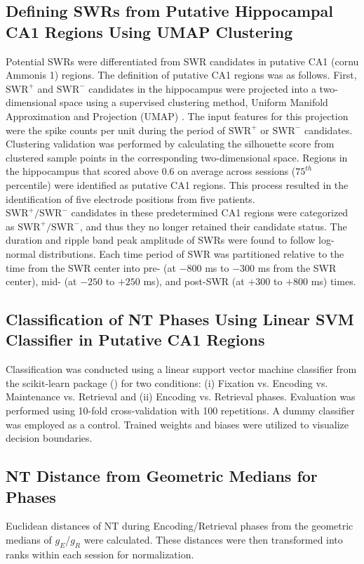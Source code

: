 \subsection{Defining SWRs from Putative Hippocampal CA1 Regions Using UMAP Clustering}
Potential SWRs were differentiated from SWR candidates in putative CA1 (cornu Ammonis 1) regions. The definition of putative CA1 regions was as follows. First, $\textrm{SWR}^+$ and $\textrm{SWR}^-$ candidates in the hippocampus were projected into a two-dimensional space using a supervised clustering method, Uniform Manifold Approximation and Projection (UMAP) \cite{mcinnes_umap_2018}. The input features for this projection were the spike counts per unit during the period of $\textrm{SWR}^+$ or $\textrm{SWR}^-$ candidates. Clustering validation was performed by calculating the silhouette score \cite{rousseeuw_silhouettes_1987} from clustered sample points in the corresponding two-dimensional space. Regions in the hippocampus that scored above 0.6 on average across sessions ($75^{th}$ percentile) were identified as putative CA1 regions. This process resulted in the identification of five electrode positions from five patients.
\\
\indent
$\textrm{SWR}^+/\textrm{SWR}^-$ candidates in these predetermined CA1 regions were categorized as $\textrm{SWR}^+/\textrm{SWR}^-$, and thus they no longer retained their candidate status. The duration and ripple band peak amplitude of SWRs were found to follow log-normal distributions. Each time period of SWR was partitioned relative to the time from the SWR center into pre- (at $-800$ ms to $-300$ ms from the SWR center), mid- (at $-250$ to $+250$ ms), and post-SWR (at $+300$ to $+800$ ms) times.
\\
\indent
\subsection{Classification of NT Phases Using Linear SVM Classifier in Putative CA1 Regions}
Classification was conducted using a linear support vector machine classifier from the scikit-learn package (\cite{10.5555/1953048.2078195}) for two conditions: (i) Fixation vs. Encoding vs. Maintenance vs. Retrieval and (ii) Encoding vs. Retrieval phases. Evaluation was performed using 10-fold cross-validation with 100 repetitions. A dummy classifier was employed as a control. Trained weights and biases were utilized to visualize decision boundaries.
\indent
\\
\indent
\subsection{NT Distance from Geometric Medians for Phases}
Euclidean distances of NT during Encoding/Retrieval phases from the geometric medians of $g_{E}$/$g_{R}$ were calculated. These distances were then transformed into ranks within each session for normalization.
\indent
\\
\indent
